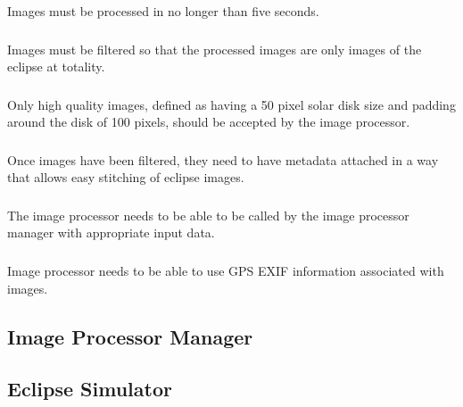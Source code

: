 \documentclass[10pt, onecolumn, draftclsnofoot, letterpaper, compsoc]{IEEEtran}
\begin{document}
Images must be processed in no longer than five seconds.\\

\subsubsection{} 

Images must be filtered so that the processed images are only images of the
eclipse at totality.\\

\subsubsection{}

Only high quality images, defined as having a 50 pixel solar disk size and
padding around the disk of 100 pixels, should be accepted by the image
processor.\\

\subsubsection{} 

Once images have been filtered, they need to have metadata attached in a way
that allows easy stitching of eclipse images. \\

\subsubsection{} 

The image processor needs to be able to be called by the image processor manager
with appropriate input data. \\

\subsubsection{} 

Image processor needs to be able to use GPS EXIF information associated with
images.\\

\subsection{Image Processor Manager}

\subsection{Eclipse Simulator}
\end{document}
